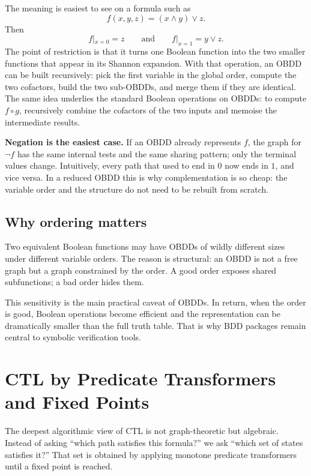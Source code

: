 The meaning is easiest to see on a formula such as
\[
  f(x,y,z) = (x \land y) \lor z.
\]
Then
\[
  f|_{x=0} = z
  \qquad\text{and}\qquad
  f|_{x=1} = y \lor z.
\]
The point of restriction is that it turns one Boolean function into the two
smaller functions that appear in its Shannon expansion.  With that operation,
an OBDD can be built recursively: pick the first variable in the global
order, compute the two cofactors, build the two sub-OBDDs, and merge them if
they are identical.  The same idea underlies the standard Boolean operations
on OBDDs: to compute $f \mathbin{\circ} g$, recursively combine the cofactors
of the two inputs and memoise the intermediate results.

\medskip\noindent
\textbf{Negation is the easiest case.}  If an OBDD already represents $f$, the
graph for $\neg f$ has the same internal tests and the same sharing pattern;
only the terminal values change.  Intuitively, every path that used to end in
$0$ now ends in $1$, and vice versa.  In a reduced OBDD this is why
complementation is so cheap: the variable order and the structure do not need
to be rebuilt from scratch.

\subsection{Why ordering matters}

\begin{example}
Two equivalent Boolean functions may have OBDDs of wildly different sizes
under different variable orders.  The reason is structural: an OBDD is not a
free graph but a graph constrained by the order.  A good order exposes shared
subfunctions; a bad order hides them.
\end{example}

This sensitivity is the main practical caveat of OBDDs.  In return, when the
order is good, Boolean operations become efficient and the representation can
be dramatically smaller than the full truth table.  That is why BDD packages
remain central to symbolic verification tools.

\section{CTL by Predicate Transformers and Fixed Points}
\label{sec:ctl-fixed-points}

The deepest algorithmic view of CTL is not graph-theoretic but algebraic.
Instead of asking ``which path satisfies this formula?'' we ask ``which set of
states satisfies it?''  That set is obtained by applying monotone predicate
transformers until a fixed point is reached.

